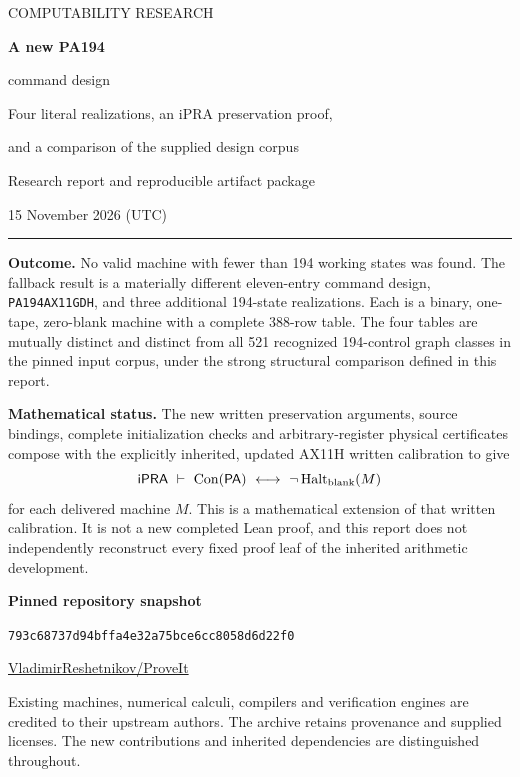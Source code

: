 \documentclass[11pt,a4paper]{article}
\newcommand{\iPRA}{\mathsf{iPRA}}
\newcommand{\PA}{\mathsf{PA}}
\newcommand{\Con}{\operatorname{Con}}
\begin{document}
\begin{titlepage}
\vspace*{16mm}
{\Large\color{inkblue}COMPUTABILITY RESEARCH}\par
\vspace{9mm}
{\Huge\bfseries A new PA194\par command design}\par
\vspace{4mm}
{\LARGE Four literal realizations, an iPRA preservation proof,\par
and a comparison of the supplied design corpus}\par
\vspace{12mm}
{\large Research report and reproducible artifact package}\par
{\large 15 November 2026 (UTC)}\par
\vspace{10mm}
\hrule
\vspace{5mm}
\textbf{Outcome.} No valid machine with fewer than 194 working states was
found. The fallback result is a materially different eleven-entry command
design, \texttt{PA194AX11GDH}, and three additional 194-state realizations.
Each is a binary, one-tape, zero-blank machine with a complete 388-row table.
The four tables are mutually distinct and distinct from all 521 recognized
194-control graph classes in the pinned input corpus, under the strong
structural comparison defined in this report.

\textbf{Mathematical status.} The new written preservation arguments,
source bindings, complete initialization checks and arbitrary-register
physical certificates compose with the explicitly inherited, updated
AX11H written calibration to give
\[
 \iPRA\ \vdash\
 \Con(\PA)\ \longleftrightarrow\
 \neg\operatorname{Halt}_{\rm blank}(M)
\]
for each delivered machine $M$. This is a mathematical extension of that
written calibration. It is not a new completed Lean proof, and this report
does not independently reconstruct every fixed proof leaf of the inherited
arithmetic development.

\vfill
\textbf{Pinned repository snapshot}\par
\nolinkurl{793c68737d94bffa4e32a75bce6cc8058d6d22f0}\par
\href{https://github.com/VladimirReshetnikov/ProveIt}{VladimirReshetnikov/ProveIt}\par
\small Existing machines, numerical calculi, compilers and verification
engines are credited to their upstream authors. The archive retains
provenance and supplied licenses. The new contributions and inherited
dependencies are distinguished throughout.
\end{titlepage}
\end{document}
